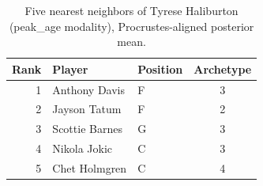 \begin{table}[htbp]
  \centering\small
  \begin{tabular}{rllc}
    \toprule
    Rank & Player & Position & Archetype \\
    \midrule
    1 & Anthony Davis & F & 3 \\
    2 & Jayson Tatum & F & 2 \\
    3 & Scottie Barnes & G & 3 \\
    4 & Nikola Jokic & C & 3 \\
    5 & Chet Holmgren & C & 4 \\
    \bottomrule
  \end{tabular}
  \caption{Five nearest neighbors of Tyrese Haliburton (peak_age modality), Procrustes-aligned posterior mean.}
  \label{tab:Tyrese_Haliburton_neighbors_peak_age}
\end{table}

